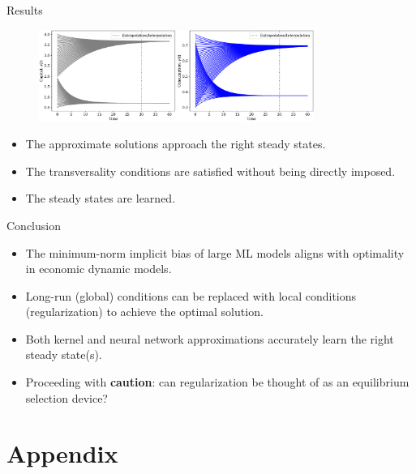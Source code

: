 \documentclass[aspectratio=169,10pt]{beamer}
\newcommand{\emphcolor}[1]{\textbf{\textcolor{emphcolorval}{#1}}}
\begin{document}
\begin{frame}{Results}
	\label{butterfly}
	\begin{figure}[t!]
		\centering
		\includegraphics[width=0.8\textwidth]{figs/neoclassical_growth_model_concave_convex_threshold.pdf}
		\vspace{-4mm}
	\end{figure}
	\begin{itemize}
		\item The approximate solutions approach the right steady states.
		\vspace{0.1in}
		\item The transversality conditions are satisfied without being directly imposed.
		\vspace{0.1in}
		\item The steady states are learned. 
		\hyperlink{DAE}{}
	\end{itemize}
\end{frame}

\begin{frame}{Conclusion}
	\begin{itemize}
		\item The minimum-norm implicit bias of large ML models aligns with optimality in economic dynamic models.
		\item Long-run (global) conditions can be replaced with local conditions (regularization) to achieve the optimal solution.
		\vspace{0.1in}
		\item Both kernel and neural network approximations accurately learn the right steady state(s).
		\vspace{0.1in}
		\item Proceeding with \emphcolor{caution}: can regularization be thought of as an equilibrium selection device?
	\end{itemize}
\end{frame}

\section{Appendix}
\end{document}
